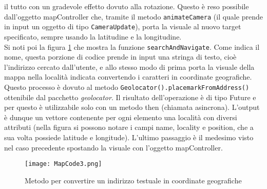 il tutto con un gradevole effetto dovuto alla rotazione. Questo è reso possibile
dall'oggetto mapController che, tramite il metodo \verb|animateCamera| (il quale prende
in input un oggetto di tipo \verb|CameraUpdate|), porta la visuale al nuovo
target specificato, sempre usando la latitudine e la longitudine. \\
Si noti poi la figura \ref{mapcode3} che mostra la funzione
\verb|searchAndNavigate|. Come indica il nome, questa porzione di codice prende
in input una stringa di testo, cioè l'indirizzo cercato dall'utente, e allo
stesso modo di prima porta la visuale della mappa nella località indicata
convertendo i caratteri in coordinate geografiche. Questo processo è dovuto
al metodo \verb|Geolocator().placemarkFromAddress()| ottenibile dal
pacchetto \textit{geolocator}. Il risultato dell'operazione è di tipo Future e
per questo è utilizzabile solo con un metodo then (chiamata asincrona). L'output
è dunque un vettore contenente per ogni elemento una località con diversi
attributi (nella figura si possono notare i campi name, locality e position, che
a sua volta possiede latitude e longitude). L'ultimo passaggio è il medesimo
visto nel caso precedente spostando la visuale con l'oggetto mapController.
\begin{figure}[!h]
    \centering
    \texttt{[image: MapCode3.png]}
    \caption{Metodo per convertire un indirizzo testuale in coordinate geografiche}
    \label{mapcode3}
\end{figure}
